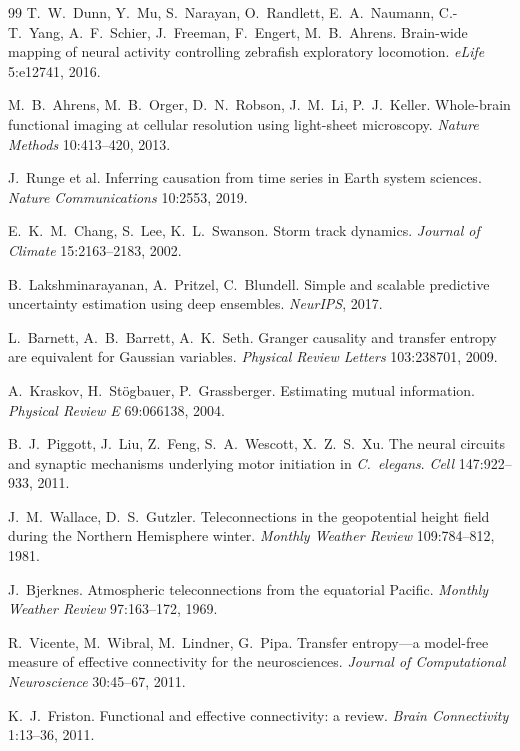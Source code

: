 \documentclass[11pt]{article}
\begin{document}
\begin{thebibliography}{99}
 T.~W.~Dunn, Y.~Mu, S.~Narayan, O.~Randlett,
E.~A.~Naumann, C.-T.~Yang, A.~F.~Schier, J.~Freeman, F.~Engert,
M.~B.~Ahrens. Brain-wide mapping of neural activity controlling zebrafish
exploratory locomotion. \emph{eLife} 5:e12741, 2016.

 M.~B.~Ahrens, M.~B.~Orger, D.~N.~Robson, J.~M.~Li,
P.~J.~Keller. Whole-brain functional imaging at cellular resolution using
light-sheet microscopy. \emph{Nature Methods} 10:413--420, 2013.

 J.~Runge et al.
Inferring causation from time series in Earth system sciences.
\emph{Nature Communications} 10:2553, 2019.

 E.~K.~M.~Chang, S.~Lee, K.~L.~Swanson.
Storm track dynamics. \emph{Journal of Climate} 15:2163--2183, 2002.

 B.~Lakshminarayanan, A.~Pritzel,
C.~Blundell. Simple and scalable predictive uncertainty estimation using
deep ensembles. \emph{NeurIPS}, 2017.

 L.~Barnett, A.~B.~Barrett, A.~K.~Seth.
Granger causality and transfer entropy are equivalent for Gaussian
variables. \emph{Physical Review Letters} 103:238701, 2009.

 A.~Kraskov, H.~St\"ogbauer, P.~Grassberger.
Estimating mutual information. \emph{Physical Review E} 69:066138, 2004.

 B.~J.~Piggott, J.~Liu, Z.~Feng, S.~A.~Wescott,
X.~Z.~S.~Xu. The neural circuits and synaptic mechanisms underlying motor
initiation in \emph{C.~elegans}. \emph{Cell} 147:922--933, 2011.

 J.~M.~Wallace, D.~S.~Gutzler.
Teleconnections in the geopotential height field during the Northern
Hemisphere winter. \emph{Monthly Weather Review} 109:784--812, 1981.

 J.~Bjerknes.
Atmospheric teleconnections from the equatorial Pacific.
\emph{Monthly Weather Review} 97:163--172, 1969.

 R.~Vicente, M.~Wibral, M.~Lindner, G.~Pipa.
Transfer entropy---a model-free measure of effective connectivity for the
neurosciences. \emph{Journal of Computational Neuroscience} 30:45--67,
2011.

 K.~J.~Friston. Functional and effective
connectivity: a review. \emph{Brain Connectivity} 1:13--36, 2011.


\end{thebibliography}
\end{document}
